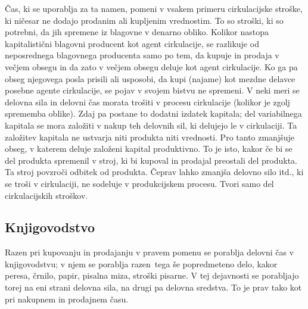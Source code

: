 \documentclass[kapital_02.tex]{subfiles}
\begin{document}
Čas, ki se uporablja za ta namen, pomeni v vsakem primeru cirkulacijske stroške, ki ničesar ne dodajo prodanim ali kupljenim vrednostim.
To so stroški, ki so potrebni, da jih spremene iz blagovne v denarno obliko. 
Kolikor nastopa kapitalistični blagovni producent kot agent cirkulacije, se razlikuje od neposrednega blagovnega producenta samo po tem, da kupuje in prodaja v večjem obsegu in da zato v večjem obsegu deluje kot agent cirkulacije.
Ko ga pa obseg njegovega posla prisili ali usposobi, da kupi (najame) kot mezdne delavce posebne agente cirkulacije, se pojav v svojem bistvu ne spremeni.
V neki meri se delovna sila in delovni čas morata trošiti v procesu cirkulacije (kolikor je zgolj sprememba oblike). 
Zdaj pa postane to dodatni izdatek kapitala; del variabilnega kapitala se mora založiti v nakup teh delovnih sil, ki delujejo le v cirkulaciji.
Ta založitev kapitala ne ustvarja niti produkta niti vrednosti.
Pro tanto zmanjšuje obseg, v katerem deluje založeni kapital produktivno.
To je isto, kakor če bi se del produkta spremenil v stroj, ki bi kupoval in prodajal preostali del produkta.
Ta stroj povzroči odbitek od produkta.
Čeprav lahko zmanjša delovno silo itd., ki se troši v cirkulaciji, ne sodeluje v produkcijskem procesu.
Tvori samo del cirkulacijskih stroškov.

\subsection{Knjigovodstvo}

Razen pri kupovanju in prodajanju v pravem pomenu se porablja delovni čas v knjigovodstvu; v njem se porablja razen\KPEstran\ tega še popredmeteno delo, kakor peresa, črnilo, papir, pisalna miza, stroški pisarne.
V tej dejavnosti se porabljajo torej na eni strani delovna sila, na drugi pa delovna sredstva.
To je prav tako kot pri nakupnem in prodajnem času.
\end{document}
